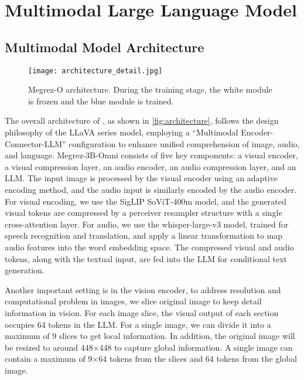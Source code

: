 \section{Multimodal Large Language Model}

\subsection{Multimodal Model Architecture}

\begin{figure}[htbp]
  \centering
  \texttt{[image: architecture\_detail.jpg]}
  \caption{Megrez-O architecture. During the training stage, the white module is frozen and the blue module is trained.}
  \label{fig:architecture}
\end{figure}


     
 The overall architecture of \ours, as shown in \autoref{fig:architecture}, follows the design philosophy of the LLaVA series model, employing a ``Multimodal Encoder-Connector-LLM'' configuration to enhance unified comprehension of image, audio, and language. Megrez-3B-Omni consists of five key components: a visual encoder, a visual compression layer, an audio encoder, an audio compression layer, and an LLM. The input image is processed by the visual encoder using an adaptive encoding method, and the audio input is similarly encoded by the audio encoder. For visual encoding, we use the SigLIP SoViT-400m model, and the generated visual tokens are compressed by a perceiver resampler structure with a single cross-attention layer. For audio, we use the whisper-large-v3 model, trained for speech recognition and translation, and apply a linear transformation to map audio features into the word embedding space. The compressed visual and audio tokens, along with the textual input, are fed into the LLM for conditional text generation.

 Another important setting is in the vision encoder, to address resolution and computational problem in images, we slice original image to keep detail information in vision. For each image slice, the visual output of each section occupies 64 tokens in the LLM. For a single image, we can divide it into a maximum of 9 slices to get local information. In addition, the original image will be resized to around 448$\times$448 to capture global information. A single image can contain a maximum of 9$\times$64 tokens from the slices and 64 tokens from the global image. 

